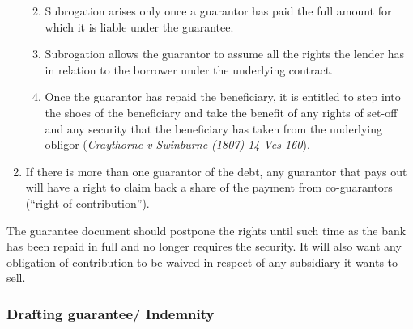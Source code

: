 \documentclass[
]{article}
\providecommand{\tightlist}{%
  \setlength{\itemsep}{0pt}\setlength{\parskip}{0pt}}
\begin{document}
\begin{enumerate}
  \begin{enumerate}
  \def\labelenumii{\arabic{enumii}.}
  \tightlist
  \item
    Subrogation arises only once a guarantor has paid the full amount
    for which it is liable under the guarantee.
  \item
    Subrogation allows the guarantor to assume all the rights the lender
    has in relation to the borrower under the underlying contract.
  \item
    Once the guarantor has repaid the beneficiary, it is entitled to
    step into the shoes of the beneficiary and take the benefit of any
    rights of set-off and any security that the beneficiary has taken
    from the underlying obligor
    (\emph{\href{https://uk.westlaw.com/D-000-5042?originationContext=document\&transitionType=PLDocumentLink\&contextData=(sc.Default)\&ppcid=9fc18fbc2d79468f9bd5272f7e22e9db}{Craythorne
    v Swinburne (1807) 14 Ves 160}}).
  \end{enumerate}
\item
  If there is more than one guarantor of the debt, any guarantor that
  pays out will have a right to claim back a share of the payment from
  co-guarantors (``right of contribution'').
\end{enumerate}

The guarantee document should postpone the rights until such time as the
bank has been repaid in full and no longer requires the security. It
will also want any obligation of contribution to be waived in respect of
any subsidiary it wants to sell.

\hypertarget{drafting-guarantee-indemnity}{%
\subsubsection{Drafting guarantee/
Indemnity}\label{drafting-guarantee-indemnity}}
\end{document}
